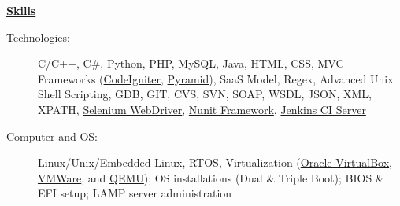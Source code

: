 \documentclass[letterpaper,11pt]{article}
\newcommand{\resheading}[1]{{\large \colorbox{mygrey}{\begin{minipage}{\textwidth}{\textbf{#1 \vphantom{p\^{E}}}}\end{minipage}}}}
\begin{document}
  \resheading{\href{http://www.derekhildreth.com/portfolio.php}{Skills}}
  \begin{description}
    \item[Technologies:] { \footnotesize C/C++,
	C\#, Python, PHP, MySQL, Java, HTML, CSS,
	MVC Frameworks (\href{http://ellislab.com/codeigniter}{CodeIgniter}, \href{http://www.pylonsproject.org/}{Pyramid}), SaaS Model,
	Regex, Advanced Unix Shell Scripting, GDB,
	GIT, CVS, SVN, SOAP, WSDL, JSON, XML, XPATH,
	\href{http://seleniumhq.org/projects/webdriver/}{Selenium
	WebDriver}, \href{http://www.nunit.org/}{Nunit Framework},
	\href{http://jenkins-ci.org/}{Jenkins CI Server}
      }
    \item[Computer and OS:] { \footnotesize
	Linux/Unix/Embedded Linux, RTOS,
	Virtualization (\href{http://www.virtualbox.org}{Oracle
	VirtualBox}, \href{http://www.vmware.com}{VMWare},
	and \href{http://www.qemu.com}{QEMU}); OS installations
	(Dual \& Triple Boot);	BIOS \& EFI setup; LAMP server administration
      }





\end{description}
\end{document}
